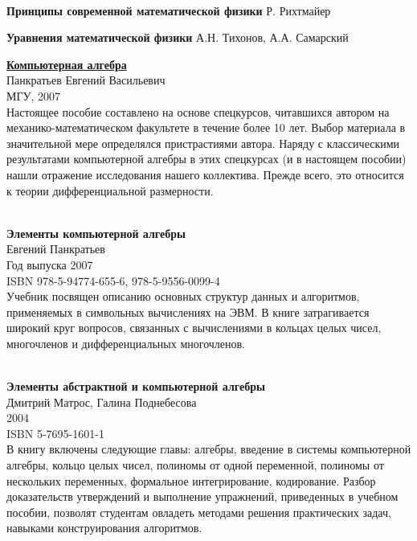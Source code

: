 \begin{thebibliography}{99}
\ \\
\textbf{Принципы современной математической физики}
Р. Рихтмайер

\textbf{Уравнения математической физики}
А.Н. Тихонов, А.А. Самарский


\href{https://drive.google.com/file/d/0B0u4WeMjO894bGQ1SC1PYnBGUG8/view?usp=sharing}{\textbf{Компьютерная алгебра}}\\
Панкратьев Евгений Васильевич\\
МГУ, 2007\\
Настоящее пособие составлено на основе спецкурсов, читавшихся автором на
механико-математическом факультете в течение более 10 лет. Выбор материала в
значительной мере определялся пристрастиями автора. Наряду с классическими
результатами компьютерной алгебры в этих спецкурсах (и в настоящем пособии)
нашли отражение исследования нашего коллектива. Прежде всего, это относится к
теории дифференциальной размерности.

\ \\
\textbf{Элементы компьютерной алгебры}\\
Евгений Панкратьев\\
Год выпуска	2007\\
ISBN	978-5-94774-655-6, 978-5-9556-0099-4\\
Учебник посвящен описанию основных структур данных и алгоритмов, применяемых в
символьных вычислениях на ЭВМ. В книге затрагивается широкий круг вопросов,
связанных с вычислениями в кольцах целых чисел, многочленов и дифференциальных
многочленов.

\ \\
\textbf{Элементы абстрактной и компьютерной алгебры}\\
Дмитрий Матрос, Галина Поднебесова\\
2004\\
ISBN	5-7695-1601-1\\
В книгу включены следующие главы: алгебры, введение в системы компьютерной
алгебры, кольцо целых чисел, полиномы от одной переменной, полиномы от
нескольких переменных, формальное интегрирование, кодирование. Разбор
доказательств утверждений и выполнение упражнений, приведенных в учебном
пособии, позволят студентам овладеть методами решения практических задач,
навыками конструирования алгоритмов.


\end{thebibliography}
